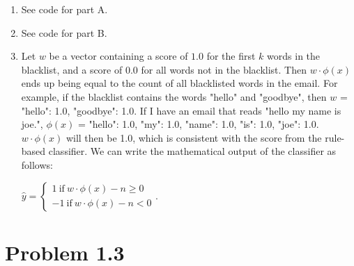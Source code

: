 \documentclass[12pt]{article}
\begin{document}
\begin{enumerate}[label=(\alph*)]
  \item See code for part A.
  \item See code for part B.
  \item Let $w$ be a vector containing a score of $1.0$ for the first $k$ words in the blacklist, and a score of $0.0$ for all words not in the blacklist. Then $w \cdot \phi(x)$ ends up being equal to the count of all blacklisted words in the email. For example, if the blacklist contains the words "hello" and "goodbye", then $w$ = {"hello": 1.0, "goodbye": 1.0}. If I have an email that reads "hello my name is joe.", $\phi(x)$ = {"hello": 1.0, "my": 1.0, "name": 1.0, "is": 1.0, "joe": 1.0}. $w \cdot \phi(x)$ will then be 1.0, which is consistent with the score from the rule-based classifier. We can write the mathematical output of the classifier as follows:

  $\hat y = \left\{ \begin{matrix} 
	1 ~\textrm{if}~ w \cdot \phi(x) - n \ge 0\\
	-1 ~\textrm{if}~ w \cdot \phi(x) - n< 0
	\end{matrix}\right..$
\end{enumerate}

\section*{Problem 1.3}
\end{document}

